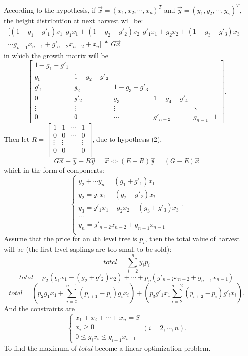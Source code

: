 \documentclass[UTF8]{article}
\begin{document}
According to the hypothesis, if $\vec{x}=(x_1,x_2,\cdots,x_n)^T$ and $\vec{y}=(y_1,y_2,\cdots,y_n)^T$, the height distribution at next harvest will be:
\begin{equation}
    \begin{aligned}
    [(1-g_1-g'_1)x_1 ~~ g_1x_1+(1-g_2-g'_2)x_2 ~~ g'_1x_1+g_2x_2+(1-g_3-g'_3)x_3 & \\ \cdots g_{n-1}x_{n-1}+g'_{n-2}x_{n-2}+x_n]\triangleq G\vec{x}
    \end{aligned}
\end{equation} 
in which the growth matrix will be 
\begin{equation}
    \begin{bmatrix}
        1-g_1-g'_1\\
        g_1 & 1-g_2-g'_2\\
        g'_1& g_2&1-g_3-g'_3\\
        0   & g'_2&g_3 & 1-g_4-g'_4\\
        \vdots& \vdots &\vdots &&\ddots\\
        0     & 0      & \cdots &g'_{n-2}&g_{n-1}&1
    \end{bmatrix}.
\end{equation}
Then let $R=\begin{bmatrix}
    1&1&\cdots&1\\
    0&0&\cdots&0\\
    \vdots&\vdots&&\vdots\\
    0  &0 &&0\\ 

\end{bmatrix}$, due to hypothesis (2), 
\begin{equation}
    G\vec{x}-\vec{y}+R\vec{y}=\vec{x} \Longleftrightarrow (E-R)\vec{y}=(G-E)\vec{x}
\end{equation}
which in the form of components:
\begin{equation}
    \begin{cases}
        y_2+\cdots y_n=(g_1+g'_1)x_1\\
        y_2 = g_1x_1-(g_2+g'_2)x_2\\
        y_3 = g'_1x_1+g_2x_2-(g_3+g'_3)x_3\\
        \cdots\\
        y_n = g'_{n-2}x_{n-2}+g_{n-1}x_{n-1}\\
    \end{cases}.
\end{equation}
Assume that the price for an $i$th level tree is $p_i$, then the total value of harvest will be (the first level saplings are too small to be sold):
$$
total=\sum_{i=2}^{n}y_ip_i
$$ 
$$
total =
p_2(g_1x_1-(g_2+g'_2)x_2)+\cdots+p_n(g'_{n-2}x_{n-2}+g_{n-1}x_{n-1})
$$
$$
total =\left( p_2g_1x_1+\sum_{i=2}^{n-1}(p_{i+1}-p_i)g_ix_i \right)+ \left(p_3g'_1x_1\sum_{i=2}^{n-2}(p_{i+2}-p_i)g'_ix_i\right).
$$
And the constraints are 
$$
\begin{cases}
    x_1+x_2+\cdots+x_n=S\\
    x_i \geq 0\\
    0\leq g_ix_i\leq g_{i-1}x_{i-1} 
\end{cases}
(i=2,\cdots,n).
$$
To find the maximum of $total$ become a linear optimization problem.
\end{document}
